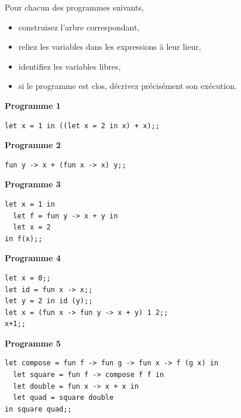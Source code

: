 \documentclass[11pt, a4paper]{article}
\author{Christian Rinderknecht}
\date{Lundi 8 mars 2004}
\begin{document}
\maketitle


\noindent Pour chacun des programmes suivants,

\begin{itemize}

  \item construisez l'arbre correspondant,

  \item reliez les variables dans les expressions à leur lieur,

  \item identifiez les variables libres,

  \item si le programme est clos, décrivez précisément son exécution.

\end{itemize}

\bigskip

\noindent \textbf{Programme 1}

\begin{verbatim}
let x = 1 in ((let x = 2 in x) + x);;
\end{verbatim}

\noindent \textbf{Programme 2}

\begin{verbatim}
fun y -> x + (fun x -> x) y;;
\end{verbatim}

\noindent \textbf{Programme 3}

\begin{verbatim}
let x = 1 in
  let f = fun y -> x + y in
  let x = 2
in f(x);;
\end{verbatim}

\noindent \textbf{Programme 4}

\begin{verbatim}
let x = 0;;
let id = fun x -> x;;
let y = 2 in id (y);;
let x = (fun x -> fun y -> x + y) 1 2;;
x+1;;
\end{verbatim}

\noindent \textbf{Programme 5}

\begin{verbatim}
let compose = fun f -> fun g -> fun x -> f (g x) in
  let square = fun f -> compose f f in
  let double = fun x -> x + x in
  let quad = square double
in square quad;;
\end{verbatim}
\end{document}
